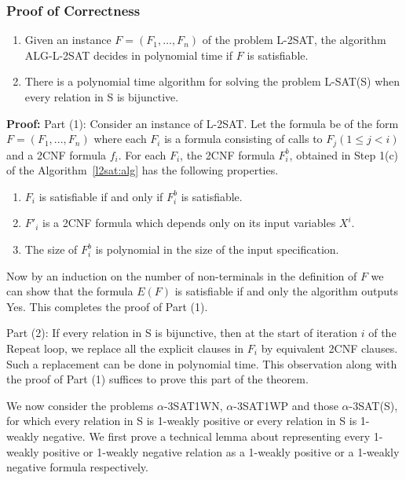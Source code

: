 \subsubsection*{Proof of Correctness}




\begin{theorem}\label{th:h2satseasy}
\begin{enumerate}
\item
Given an instance $F = (F_1, \ldots, F_n)$ of the problem L-2SAT, 
the algorithm ALG-L-2SAT decides 
in polynomial time if $F$ is satisfiable. 
\item
There is a polynomial time algorithm for solving the problem L-SAT(S)
when every relation in S is bijunctive.
\end{enumerate}
\end{theorem}

\noindent
{\bf Proof:}
Part (1): 
Consider an instance of {\sf L-2SAT}.
Let the formula be of the form $F = (F_1,...,F_n)$ where each
$F_i$ is a formula consisting of calls to $F_j (1 \leq j < i)$ and a
{\sf 2CNF} formula $f_i$. 
For each $F_i$, the  {\sf 2CNF} formula $F^b_i$, 
obtained in Step 1(c) of the Algorithm~\ref{l2sat:alg} 
has the following properties.
\begin{enumerate}
\item
$F_i$ is satisfiable if and only if  $F^b_i$ is satisfiable.

\item
$F'_i$ is a {\sf 2CNF} formula which depends only on its input variables
$X^i$.

\item
The size of $F^b_i$ is polynomial in the size of the input specification.
\end{enumerate}
Now by an induction on the number of non-terminals in the definition of 
$F$ we can show that the formula $E(F)$ is satisfiable if and only the 
algorithm outputs Yes. This completes the proof of Part (1).


\noindent
Part (2): If every relation in {\sf S} 
is bijunctive, then at the start of iteration $i$ of the Repeat loop, 
we replace all the explicit clauses in $F_i$ by equivalent {\sf 2CNF} clauses.
Such a replacement can be done in polynomial time.
This observation along with the proof of Part (1) suffices to prove this part
of the theorem. \hfill\QED


We now consider the problems $\alpha$-{\sf 3SAT1WN}, $\alpha$-{\sf 3SAT1WP} and
those $\alpha$-{\sf 3SAT(S)}, for which 
every relation in {\sf S} is 1-weakly positive or
every relation in {\sf S} is 1-weakly negative. We first prove a technical
lemma about representing every 1-weakly positive or 1-weakly negative relation
as a 1-weakly positive or a 1-weakly negative formula respectively.

